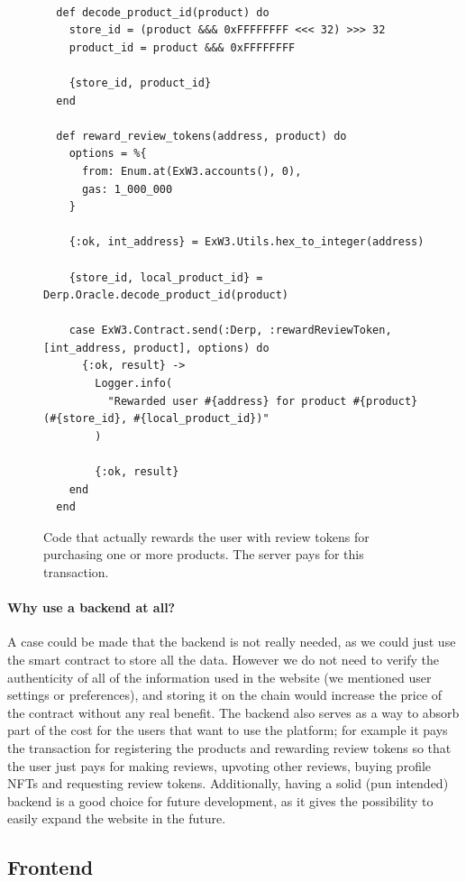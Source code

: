 \documentclass[12pt,a4paper,oneside]{article}
\theoremstyle{definition}
\begin{document}
\begin{figure}[H]
	\begin{verbatim}

  def decode_product_id(product) do
    store_id = (product &&& 0xFFFFFFFF <<< 32) >>> 32
    product_id = product &&& 0xFFFFFFFF

    {store_id, product_id}
  end

  def reward_review_tokens(address, product) do
    options = %{
      from: Enum.at(ExW3.accounts(), 0),
      gas: 1_000_000
    }

    {:ok, int_address} = ExW3.Utils.hex_to_integer(address)

    {store_id, local_product_id} = Derp.Oracle.decode_product_id(product)

    case ExW3.Contract.send(:Derp, :rewardReviewToken, [int_address, product], options) do
      {:ok, result} ->
        Logger.info(
          "Rewarded user #{address} for product #{product} (#{store_id}, #{local_product_id})"
        )

        {:ok, result}
    end
  end
    \end{verbatim}
	\label{code:review-token-reward}
	\caption{Code that actually rewards the user with review tokens for purchasing one or more products. The server pays for this transaction.}
\end{figure}

\paragraph{Why use a backend at all?} A case could be made that the backend is not really needed, as we could just use the smart contract to store all the data. However we do not need to verify the authenticity of all of the information used in the website (we mentioned user settings or preferences), and storing it on the chain would increase the price of the contract without any real benefit.
The backend also serves as a way to absorb part of the cost for the users that want to use the platform; for example it pays the transaction for registering the products and rewarding review tokens so that the user just pays for making reviews, upvoting other reviews, buying profile NFTs and requesting review tokens.
Additionally, having a solid (pun intended) backend is a good choice for future development, as it gives the possibility to easily expand the website in the future.

\subsection{Frontend}
\end{document}
